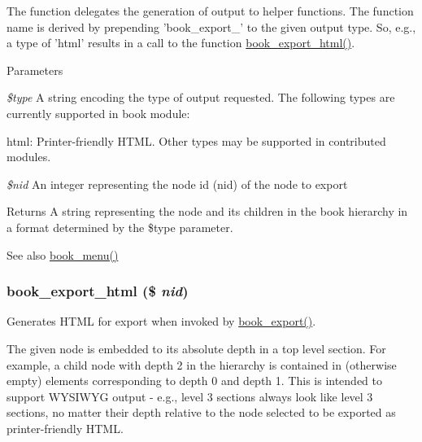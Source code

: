 The function delegates the generation of output to helper functions. The function name is derived by prepending 'book\_\-export\_\-' to the given output type. So, e.g., a type of 'html' results in a call to the function \hyperlink{book_8pages_8inc_a9916aa7ebfa4de8b221ba9e33592bb69}{book\_\-export\_\-html()}.


\begin{DoxyParams}{Parameters}
\item[{\em \$type}]A string encoding the type of output requested. The following types are currently supported in book module:
\begin{DoxyItemize}
\item html: Printer-\/friendly HTML. Other types may be supported in contributed modules. 
\end{DoxyItemize}\item[{\em \$nid}]An integer representing the node id (nid) of the node to export\end{DoxyParams}
\begin{DoxyReturn}{Returns}
A string representing the node and its children in the book hierarchy in a format determined by the \$type parameter.
\end{DoxyReturn}
\begin{DoxySeeAlso}{See also}
\hyperlink{book_8module_adc2bbd5235a769fa1ae9b02e8effc15e}{book\_\-menu()} 
\end{DoxySeeAlso}
\hypertarget{book_8pages_8inc_a9916aa7ebfa4de8b221ba9e33592bb69}{
\subsubsection[{book\_\-export\_\-html}]{\setlength{\rightskip}{0pt plus 5cm}book\_\-export\_\-html (\$ {\em nid})}}
\label{book_8pages_8inc_a9916aa7ebfa4de8b221ba9e33592bb69}
Generates HTML for export when invoked by \hyperlink{book_8pages_8inc_adcfa1ae54cd2673dfedbae459ea573de}{book\_\-export()}.

The given node is embedded to its absolute depth in a top level section. For example, a child node with depth 2 in the hierarchy is contained in (otherwise empty)  elements corresponding to depth 0 and depth 1. This is intended to support WYSIWYG output -\/ e.g., level 3 sections always look like level 3 sections, no matter their depth relative to the node selected to be exported as printer-\/friendly HTML.

